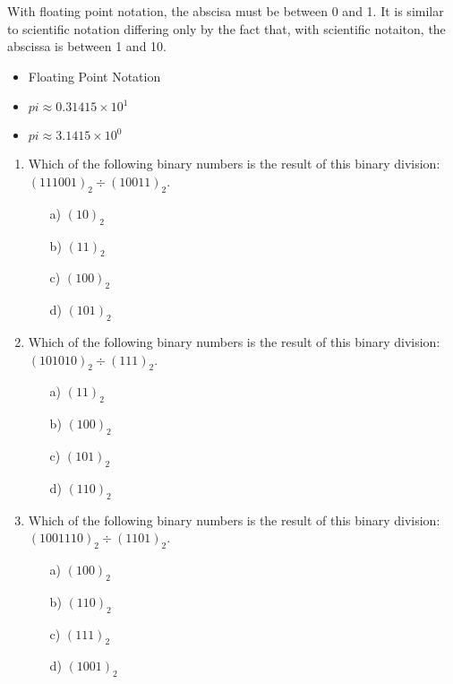 \documentclass[]{report}
\begin{document}
With floating point notation, the abscisa must be between 0 and 1.
It is similar to scientific notation differing only by the fact that, with scientific notaiton, the abscissa is between 1 and 10.

\begin{itemize}
\item Floating Point Notation
\item $pi \approx 0.31415 \times 10^1$
\item $pi \approx 3.1415 \times 10^0$
\end{itemize}


	\begin{enumerate}
		\item Which of the following binary numbers is the result of this binary division: $(111001)_{2} \div ( 10011)_{2}$. %
		\begin{multicols}{2}
			\begin{itemize}
				\item[a)] $(10)_2$ %
				\item[b)] $(11)_{2}$ %
				\item[c)] $(100)_{2}$ %
				\item[d)] $(101)_{2}$ %
			\end{itemize}
		\end{multicols}
		\item Which of the following binary numbers is the result of this binary division: $(101010)_{2} \div ( 111 )_{2}$. %
		\begin{multicols}{2}
			\begin{itemize}
				\item[a)] $(11)_2$ %
				\item[b)] $(100)_{2}$ %
				\item[c)] $(101)_{2}$ %
				\item[d)] $(110)_{2}$ %
			\end{itemize}
		\end{multicols}
		\item Which of the following binary numbers is the result of this binary division: $(1001110)_{2} \div ( 1101 )_{2}$. %
		\begin{multicols}{2}
			\begin{itemize}
				
				\item[a)] $(100)_{2}$ %
				\item[b)] $(110)_{2}$ %
				\item[c)] $(111)_{2}$ %
				\item[d)] $(1001)_2$ %
			\end{itemize}
		\end{multicols}
	\end{enumerate}
	
\end{document}
